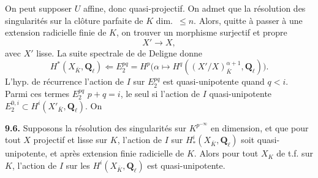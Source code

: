 \documentclass[11pt,a4paper]{article}
\begin{document}
On peut supposer \ill{} \ill{} $U$ affine, donc quasi-projectif. \struck{\ill{}} On admet que la résolution des singularités sur la clôture parfaite \struck{\ill{}} de $K$ \ill{} dim.\ $\leq n$. Alors, quitte à passer à une extension radicielle finie de $K$, on  trouver un \add{\ill{}} morphisme surjectif  et propre
\[
X' \longrightarrow X ,
\]
avec $X'$ lisse. \struck{\ill{}} La suite spectrale de  de Deligne donne
\[
H^*(X_{\bar K}, \mathbf{Q}_\ell) \Longleftarrow E_2^{pq} = H^p\bigl(\alpha \longmapsto H^q((X'/X)^{\alpha+1}_{\bar K}, \mathbf{Q}_\ell)\bigr) .
\]
   L'hyp. de récurrence \ill{} \ill{} \ill{}  \ill{}  l'action de $I$ sur $E_2^{pq}$ est quasi-unipotente quand $q < i$.   Parmi ces termes $E_2^{pq}$ \ill{} $p + q = i$, le seul \ill{} \ill{} \ill{} \ill{}  si l'action de $I$ \ill{} quasi-unipotente \ill{} \ill{} $E_2^{0,i} \subset H^i(X'_{\bar K}, \mathbf{Q}_\ell)$.  On \ill{} \ill{}


\textbf{  9.6.} Supposons la résolution des singularités  sur $K^{p^{-\infty}}$ en  dimension, et que pour tout $X$ \struck{\ill{}} projectif et lisse sur $K$, \struck{\ill{}} l'action de $I$ sur $H^i_*(X_{\bar K}, \mathbf{Q}_\ell)$ soit quasi-unipotente, et  après extension finie radicielle de $K$. Alors \struck{\ill{}} pour tout $X_K$ de t.f. sur $K$, l'action de $I$ sur les $H^i(X_{\bar K}, \mathbf{Q}_\ell)$ est quasi-unipotente.
\end{document}
